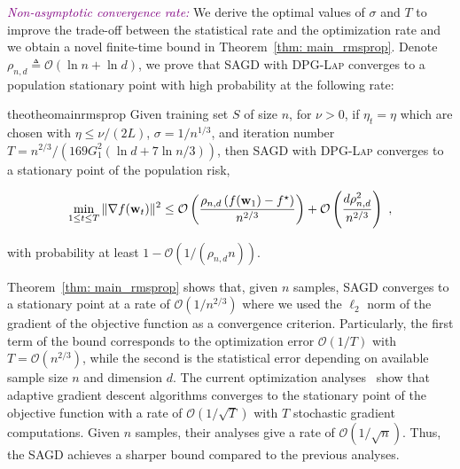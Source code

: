 \documentclass[11pt]{article}
\begin{document}
\textcolor{purple}{\textit{Non-asymptotic convergence rate:}}
We derive the optimal values of $\sigma$ and $T$ to improve the trade-off between the statistical rate and the optimization rate and we obtain a novel finite-time bound in Theorem~\ref{thm: main_rmsprop}. 
Denote $\rho_{n,d} \triangleq\mathcal{O} \left(\ln n + \ln d\right)$, we prove that \textsc{SAGD} with \textsc{DPG-Lap} converges to a population stationary point with high probability at the following rate:

\begin{restatable}{theo}{theomainrmsprop}
\label{thm: main_rmsprop}
 Given training set $S$ of size $n$, for $\nu >0$, if $\eta_t = \eta$ which are chosen with $\eta \leq \nu/(2L)$,  $\sigma = 1/n^{1/3}$, and iteration number $T = n^{2/3}/\left(169G_1^2(\ln d +7\ln n/3)\right)$, then \textsc{SAGD} with \textsc{DPG-Lap} converges to a stationary point of the population risk, \ie 
 \begin{small}
\begin{equation*}
 \min_{1\leq t \leq T}\|\nabla f(\mathbf{w}_t)\|^2 \leq
\mathcal{O} \left( \frac{\rho_{n,d} \left(f(\mathbf{w}_1) - f^\star \right)}{n^{2/3}} \right) + \mathcal{O} \left( \frac{d \rho_{n,d}^2}{n^{2/3}}\right)~,
\end{equation*}
\end{small}
with probability at least $1-\mathcal{O} \left(1/(\rho_{n,d} n)\right)$.
\end{restatable} 
Theorem~\ref{thm: main_rmsprop} shows that, given $n$ samples, \textsc{SAGD} converges to a stationary point at a rate of $\mathcal{O}(1/n^{2/3})$ where we used the $\ell_2$ norm of the gradient of the objective function as a convergence criterion.
Particularly, the first term of the bound corresponds to the optimization error $\mathcal{O}(1/T)$ with $T = \mathcal{O}(n^{2/3})$, while the second is the statistical error depending on available sample size $n$ and dimension $d$. 
The current optimization analyses~\citep{zare18, wawu19, zosh2019, cheli2019} show that adaptive gradient descent algorithms converges to the stationary point of the objective function with a rate of $\mathcal{O}(1/\sqrt{T})$ with $T$ stochastic gradient computations. 
Given $n$ samples, their analyses give a rate of  $\mathcal{O}(1/\sqrt{n})$. 
Thus, the \textsc{SAGD} achieves a sharper bound compared to the previous analyses.  
\end{document}
